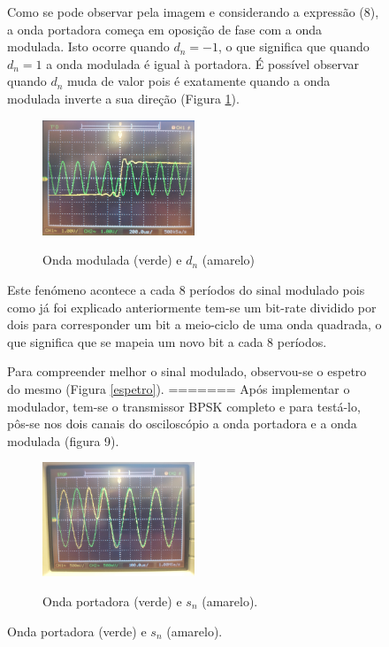 \documentclass[11pt]{article}
\begin{document}
\begin{figure}[H]
Como se pode observar pela imagem e considerando a expressão (8), a onda portadora começa em oposição de fase com a onda modulada. Isto ocorre quando $d_n=-1$, o que significa que quando $d_n=1$ a onda modulada é igual à portadora. É possível observar quando $d_n$ muda de valor pois é exatamente quando a onda modulada inverte a sua direção (Figura \ref{dn_mod}). 

\begin{figure}[H]
	\centering
	\includegraphics[width=0.5\textwidth]{./dn_mod}~\\
	\caption{Onda modulada (verde) e $d_n$ (amarelo)}
	\label{dn_mod}
\end{figure}

Este fenómeno acontece a cada 8 períodos do sinal modulado pois como já foi explicado anteriormente tem-se um bit-rate dividido por dois para corresponder um bit a meio-ciclo de uma onda quadrada, o que significa que se mapeia um novo bit a cada 8 períodos. 
\vspace{2 mm}

Para compreender melhor o sinal modulado, observou-se o espetro do mesmo (Figura \ref{espetro}).
=======
Após implementar o modulador, tem-se o transmissor BPSK completo e para testá-lo, pôs-se nos dois canais do osciloscópio a onda portadora e a onda modulada (figura 9).

\begin{figure}[H]
	\centering
	\includegraphics[width=0.5\textwidth]{./port_sn}~\\
	\caption{Onda portadora (verde) e $s_n$ (amarelo).}
\end{figure}


\end{figure}
\end{document}
